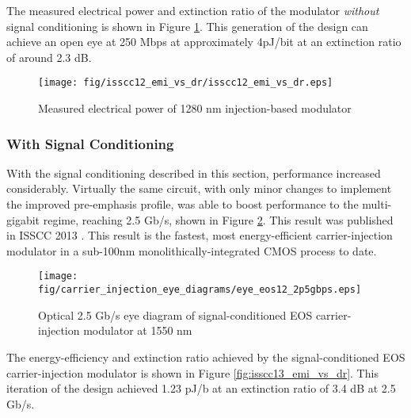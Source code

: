 The measured electrical power and extinction ratio of the modulator \emph{without} signal conditioning is shown in Figure \ref{fig:isscc12_emi_vs_dr}.  This generation of the design can achieve an open eye at 250 Mbps at approximately 4pJ/bit at an extinction ratio of around 2.3 dB.

	\begin{figure}[H]
		\begin{center}
			\texttt{[image: fig/isscc12\_emi\_vs\_dr/isscc12\_emi\_vs\_dr.eps]}
			\caption{\label{fig:isscc12_emi_vs_dr}Measured electrical power of 1280 nm injection-based modulator}
		\end{center}
	\end{figure}



\vspace{-2em}
\subsubsection{With Signal Conditioning}

With the signal conditioning described in this section, performance increased considerably.  Virtually the same circuit, with only minor changes to implement the improved pre-emphasis profile, was able to boost performance to the multi-gigabit regime, reaching 2.5 Gb/s, shown in Figure \ref{fig:eye_eos12_2p5gbps}.  This result was published in ISSCC 2013 \cite{moss_isscc13}.  This result is the fastest, most energy-efficient carrier-injection modulator in a sub-100nm monolithically-integrated CMOS process to date.

	\begin{figure}[H]
		\begin{center}
			\texttt{[image: fig/carrier\_injection\_eye\_diagrams/eye\_eos12\_2p5gbps.eps]}
			\caption{\label{fig:eye_eos12_2p5gbps}Optical 2.5 Gb/s eye diagram of signal-conditioned EOS carrier-injection modulator at 1550 nm}
		\end{center}
	\end{figure}

The energy-efficiency and extinction ratio achieved by the signal-conditioned EOS carrier-injection modulator is shown in Figure \ref{fig:isscc13_emi_vs_dr}. This iteration of the design achieved 1.23 pJ/b at an extinction ratio of 3.4 dB at 2.5 Gb/s.


